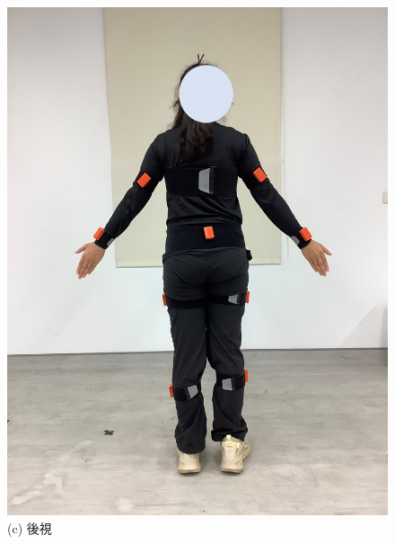 \begin{figure}[!ht]
\begin{minipage}{.25\textwidth}
      \includegraphics[width=.95\linewidth]{figure/ch3_fig_backimu.JPG}
      \caption*{(c) 後視}
   \end{minipage}%
   \begin{minipage}{.25\textwidth}
     \centering

\end{minipage}
\end{figure}
